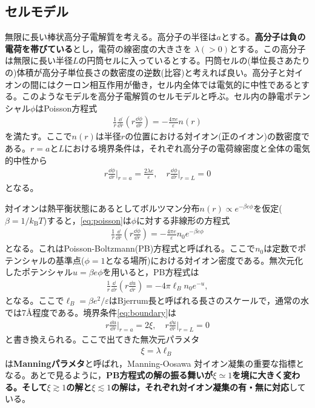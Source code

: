\documentclass[11pt,a4paper]{ltjsarticle}
\theoremstyle{definition}
\theoremstyle{remark}
\begin{document}
\subsection{セルモデル}
無限に長い棒状高分子電解質を考える。高分子の半径は$a$とする。\textbf{高分子は負の電荷を帯びている}とし，電荷の線密度の大きさを $\lambda(>0)$とする。この高分子は無限に長い半径$L$の円筒セルに入っているとする。円筒セルの(単位長さあたりの)体積が高分子単位長さの数密度の逆数(比容)と考えれば良い。高分子と対イオンの間にはクーロン相互作用が働き，セル内全体では電気的に中性であるとする。このようなモデルを高分子電解質のセルモデルと呼ぶ。セル内の静電ポテンシャル$\phi$はPoisson方程式
\begin{align}
\frac{1}{r}\frac{\dd}{\dd r}\left(r\frac{\dd \phi}{\dd r}\right)=-\frac{4\pi e}{\varepsilon}n(r) \label{eq:poisson}
\end{align}
を満たす。ここで$n(r)$は半径$r$の位置における対イオン(正のイオン)の数密度である。$r=a$と$L$における境界条件は，それぞれ高分子の電荷線密度と全体の電気的中性から
\begin{align}
  r\frac{\dd\phi}{\dd r}\bigg|_{r=a}=\frac{2\lambda e}{\varepsilon}, \quad r\frac{\dd\phi}{\dd r}\bigg|_{r=L}=0 \label{eq:boundary}
\end{align}
となる。



対イオンは熱平衡状態にあるとしてボルツマン分布$n(r)\propto e ^{-\beta e \phi}$を仮定($\beta=1/k_\mathrm{B}T$)すると，\eqref{eq:poisson}は$\phi$に対する非線形の方程式
\begin{align}
\frac{1}{r}\frac{\dd}{\dd r}\left(r\frac{\dd \phi}{\dd r}\right)=-\frac{4\pi e}{\varepsilon}n_0 e^{-\beta e \phi}
\end{align}
となる。これはPoisson-Boltzmann(PB)方程式と呼ばれる。ここで$n_0$は定数でポテンシャルの基準点($\phi=1$となる場所)における対イオン密度である。無次元化したポテンシャル$u=\beta e \phi$を用いると，PB方程式は
\begin{align}
  \frac{1}{r}\frac{\dd}{\dd r}\left(r\frac{\dd u}{\dd r}\right)=-4\pi \ell_Bn_0 e^{-u}, \label{eq:pb}
\end{align}
となる。ここで$\ell_B=\beta e^2/\varepsilon$はBjerrum長と呼ばれる長さのスケールで，通常の水では7\AA 程度である。境界条件\eqref{eq:boundary}は
\begin{align}
  r\frac{\dd u}{\dd r}\bigg|_{r=a}=2\xi, \quad r\frac{\dd u}{\dd r}\bigg|_{r=L}=0 \label{eq:boundary2}
\end{align}
と書き換えられる。ここで出てきた無次元パラメタ
\begin{align}
  \xi=\lambda \ell_B \label{eq:xi}
\end{align}
は\textbf{Manningパラメタ}と呼ばれ\cite{Manning1969_I,Manning1969_II}，Manning-Oosawa 対イオン凝集の重要な指標となる。あとで見るように，\textbf{PB方程式の解の振る舞いが$\xi\simeq 1$を境に大きく変わる。そして$\xi \gtrsim 1$の解と$\xi \lesssim 1$の解は，それぞれ対イオン凝集の有・無に対応}している。
\end{document}
